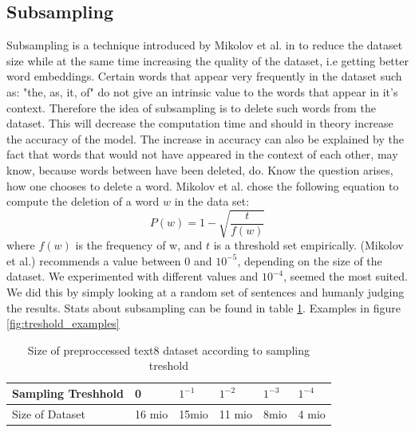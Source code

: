 \subsection{Subsampling}
Subsampling is a technique introduced by Mikolov et al. in \cite{mikolov} to reduce the dataset size while at the same time increasing the quality of the dataset, i.e getting better word embeddings. Certain words that appear very frequently in the dataset such as: "the, as, it, of" do not give an intrinsic value to the words that appear in it's context. Therefore the idea of subsampling is to delete such words from the dataset. This will decrease the computation time and should in theory increase the accuracy of the model. The increase in accuracy can also be explained by the fact that words that would not have appeared in the context of each other, may know, because words between have been deleted, do.
Know the question arises, how one chooses to delete a word. Mikolov et al. chose the following equation to compute the deletion of a word $w$ in the data set:
\begin{equation} \label{eq:sampling}
P(w) = 1- \sqrt{{\frac{t}{f(w)}}}
\end{equation}
where $f(w)$ is the frequency of w, and $t$ is a threshold set empirically. (Mikolov et al.)  recommends a value between $0$ and $10^{-5}$, depending on the size of the dataset. We experimented with different values and $10^{-4}$, seemed the most suited. We did this by simply looking at a random set of sentences and humanly judging the results. Stats about subsampling can be found in table \ref{table:treshold}. Examples in figure \ref{fig:treshold_examples}

\begin{table}[h]
\centering
\begin{tabular}{|l|l|l|l|l|l|}
\hline
Sampling Treshhold &  0      &      $ 1^{-1}$&$   1^{-2}$& $1^{-3}     $ &$1^{-4}   $    \\ \hline
Size of Dataset    & 16 mio & 15mio & 11 mio & 8mio & 4 mio \\ \hline
\end{tabular}
\caption{Size of preproccessed text8 dataset according to sampling treshold}
\label{table:treshold}
\end{table}

